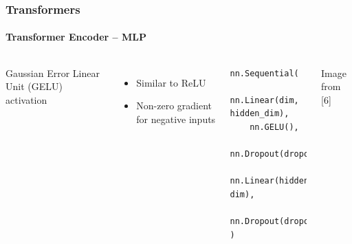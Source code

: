 \documentclass[xetex,professionalfont]{beamer}
\renewcommand\emph[1]{\textcolor{tuwcvl_cvl_blue}{#1}}
\begin{document}
\begin{frame}[fragile]
	\frametitle{Transformers}
	\framesubtitle{Transformer Encoder -- MLP}

	\begin{columns}

		\emph{Gaussian Error Linear Unit} (\emph{GELU}) activation %
		\begin{itemize}
			\item Similar to ReLU
			\item Non-zero gradient for negative inputs %
		\end{itemize}

		\smallskip

		\begin{verbatim}
nn.Sequential(
    nn.Linear(dim, hidden_dim),
    nn.GELU(),
    nn.Dropout(dropout),
    nn.Linear(hidden_dim, dim),
    nn.Dropout(dropout)
)
\end{verbatim}


		\begin{center}
			{\centering Image from [6]}
		\end{center}

	\end{columns}

\end{frame}
\end{document}
